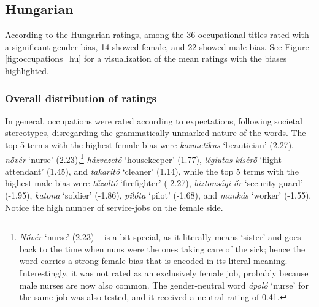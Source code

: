 \documentclass[11pt]{article}
\begin{document}
\subsection{Hungarian}



According to the Hungarian ratings, among the 36 occupational titles rated with a significant gender bias, 14 showed female, and 22 showed male bias. See Figure \ref{fig:occupations_hu} for a visualization of the mean ratings with the biases highlighted.

\subsubsection{Overall distribution of ratings}

In general, occupations were rated according to expectations, following societal stereotypes, disregarding the grammatically unmarked nature of the words. The top 5 terms with the highest female bias were \textit{kozmetikus} `beautician' (2.27), \textit{nővér} `nurse' (2.23),\footnote{\textit{Nővér} `nurse' (2.23) -- is a bit special, as it literally means `sister' and goes back to the time when nuns were the ones taking care of the sick; hence the word carries a strong female bias that is encoded in its literal meaning. Interestingly, it was not rated as an exclusively female job, probably because male nurses are now also common. The gender-neutral word \textit{ápoló} `nurse' for the same job was also tested, and it received a neutral rating of 0.41.} \textit{házvezető} `housekeeper' (1.77), \textit{légiutas-kísérő} `flight attendant' (1.45), and \textit{takarító} `cleaner' (1.14), while the top 5 terms with the highest male bias were \textit{tűzoltó} `firefighter' (-2.27), \textit{biztonsági őr} `security guard' (-1.95), \textit{katona} `soldier' (-1.86), \textit{pilóta} `pilot' (-1.68), and \textit{munkás} `worker' (-1.55). Notice the high number of service-jobs on the female side.
\end{document}
